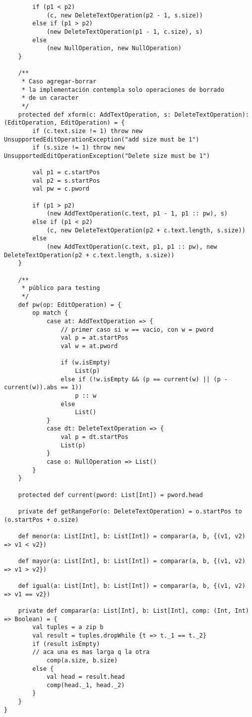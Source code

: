 {\begin{verbatim}
        if (p1 < p2)
            (c, new DeleteTextOperation(p2 - 1, s.size))
        else if (p1 > p2)
            (new DeleteTextOperation(p1 - 1, c.size), s)
        else
            (new NullOperation, new NullOperation)
    }

    /**
     * Caso agregar-borrar
     * la implementación contempla solo operaciones de borrado
     * de un caracter
     */
    protected def xform(c: AddTextOperation, s: DeleteTextOperation): (EditOperation, EditOperation) = {
        if (c.text.size != 1) throw new UnsupportedEditOperationException("add size must be 1")
        if (s.size != 1) throw new UnsupportedEditOperationException("Delete size must be 1")

        val p1 = c.startPos
        val p2 = s.startPos
        val pw = c.pword

        if (p1 > p2)
            (new AddTextOperation(c.text, p1 - 1, p1 :: pw), s)
        else if (p1 < p2)
            (c, new DeleteTextOperation(p2 + c.text.length, s.size))
        else
            (new AddTextOperation(c.text, p1, p1 :: pw), new DeleteTextOperation(p2 + c.text.length, s.size))
    }

    /**
     * público para testing
     */
    def pw(op: EditOperation) = {
        op match {
            case at: AddTextOperation => {
                // primer caso si w == vacio, con w = pword
                val p = at.startPos
                val w = at.pword

                if (w.isEmpty)
                    List(p)
                else if (!w.isEmpty && (p == current(w) || (p - current(w)).abs == 1))
                    p :: w
                else
                    List()
            }
            case dt: DeleteTextOperation => {
                val p = dt.startPos
                List(p)
            }
            case o: NullOperation => List()
        }
    }

    protected def current(pword: List[Int]) = pword.head

    private def getRangeFor(o: DeleteTextOperation) = o.startPos to (o.startPos + o.size)

    def menor(a: List[Int], b: List[Int]) = comparar(a, b, {(v1, v2) => v1 < v2})

    def mayor(a: List[Int], b: List[Int]) = comparar(a, b, {(v1, v2) => v1 > v2})

    def igual(a: List[Int], b: List[Int]) = comparar(a, b, {(v1, v2) => v1 == v2})

    private def comparar(a: List[Int], b: List[Int], comp: (Int, Int) => Boolean) = {
        val tuples = a zip b
        val result = tuples.dropWhile {t => t._1 == t._2}
        if (result isEmpty)
        // aca una es mas larga q la otra
            comp(a.size, b.size)
        else {
            val head = result.head
            comp(head._1, head._2)
        }
    }
}
\end{verbatim}
}
